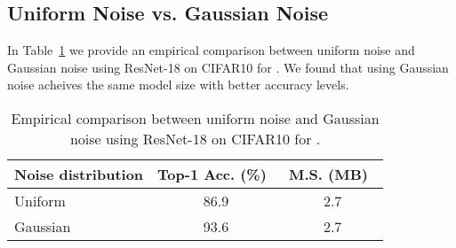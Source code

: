 \subsection{Uniform Noise vs. Gaussian Noise}
In Table~\ref{supp:noise} we provide an empirical comparison between uniform noise and Gaussian noise using ResNet-18 on CIFAR10 for \diffq. We found that using Gaussian noise acheives the same model size with better accuracy levels.

\begin{table}[t!]
\caption{Empirical comparison between uniform noise and Gaussian noise using ResNet-18 on CIFAR10 for \diffq.}
\label{supp:noise}
\vskip 0.15in
\begin{center}
\begin{small}
\begin{sc}
\begin{tabular}{l|cc}
\toprule
		Noise distribution & Top-1 Acc. (\%)~ & M.S. (MB)~ \\
\midrule
Uniform  	    & 86.9      & 2.7 \\
Gaussian  	    & 93.6      & 2.7  \\
\bottomrule
\end{tabular}
\end{sc}
\end{small}
\end{center}
\end{table}
